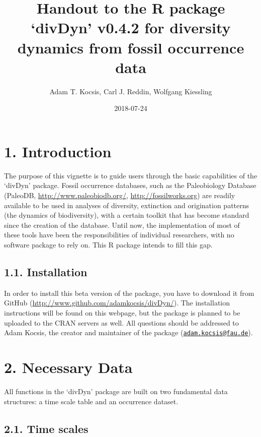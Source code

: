 \documentclass[]{article}
\title{Handout to the R package `divDyn' v0.4.2 for diversity dynamics from
fossil occurrence data}
\author{Adam T. Kocsis, Carl J. Reddin, Wolfgang Kiessling}
\date{2018-07-24}
\begin{document}
\maketitle

\hypertarget{introduction}{%
\section{1. Introduction}\label{introduction}}

The purpose of this vignette is to guide users through the basic
capabilities of the `divDyn' package. Fossil occurrence databases, such
as the Paleobiology Database (PaleoDB, \url{http://www.paleobiodb.org/},
\url{http://fossilworks.org}) are readily available to be used in
analyses of diversity, extinction and origination patterns (the dynamics
of biodiversity), with a certain toolkit that has become standard since
the creation of the database. Until now, the implementation of most of
these tools have been the responsibilities of individual researchers,
with no software package to rely on. This R package intends to fill this
gap.

\hypertarget{installation}{%
\subsection{1.1. Installation}\label{installation}}

In order to install this beta version of the package, you have to
download it from GitHub
(\url{http://www.github.com/adamkocsis/divDyn/}). The installation
instructions will be found on this webpage, but the package is planned
to be uploaded to the CRAN servers as well. All questions should be
addressed to Adam Kocsis, the creator and maintainer of the package
(\href{mailto:adam.kocsis@fau.de}{\nolinkurl{adam.kocsis@fau.de}}).

\hypertarget{necessary-data}{%
\section{2. Necessary Data}\label{necessary-data}}

All functions in the `divDyn' package are built on two fundamental data
structures: a time scale table and an occurrence dataset.

\hypertarget{time-scales}{%
\subsection{2.1. Time scales}\label{time-scales}}
\end{document}
